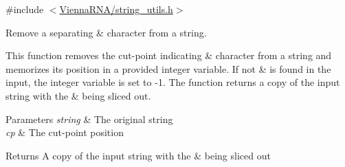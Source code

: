 {\ttfamily \#include $<$\hyperlink{string__utils_8h}{Vienna\+R\+N\+A/string\+\_\+utils.\+h}$>$}



Remove a separating \textquotesingle{}\&\textquotesingle{} character from a string. 

This function removes the cut-\/point indicating \textquotesingle{}\&\textquotesingle{} character from a string and memorizes its position in a provided integer variable. If not \textquotesingle{}\&\textquotesingle{} is found in the input, the integer variable is set to -\/1. The function returns a copy of the input string with the \textquotesingle{}\&\textquotesingle{} being sliced out.


\begin{DoxyParams}{Parameters}
{\em string} & The original string \\
\hline
{\em cp} & The cut-\/point position \\
\hline
\end{DoxyParams}
\begin{DoxyReturn}{Returns}
A copy of the input string with the \textquotesingle{}\&\textquotesingle{} being sliced out 
\end{DoxyReturn}
